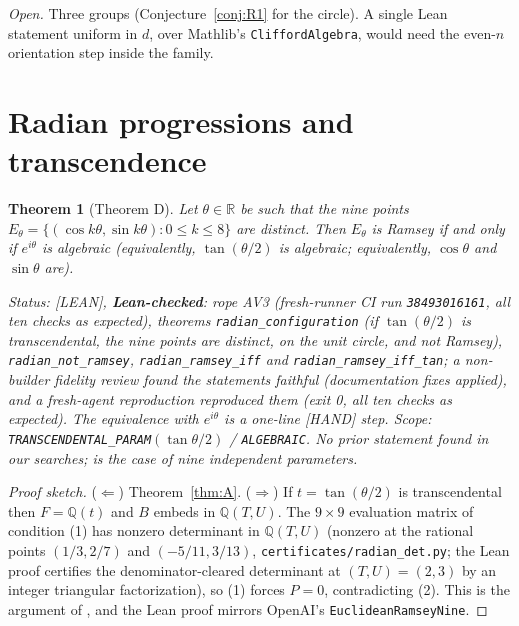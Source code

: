 \documentclass[11pt]{amsart}
\newcommand{\st}[1]{\textsf{[#1]}}
\newcommand{\Q}{\mathbb{Q}}
\newcommand{\R}{\mathbb{R}}
\theoremstyle{plain}
\newtheorem{theorem}{Theorem}[section]
\theoremstyle{definition}
\begin{document}
\noindent\emph{Open.} Three groups (Conjecture~\ref{conj:R1} for the circle). A single Lean statement
uniform in $d$, over Mathlib's \texttt{CliffordAlgebra}, would need the even-$n$ orientation step
inside the family.

\section{Radian progressions and transcendence}\label{sec:radian}

\begin{theorem}[Theorem D]\label{thm:D}
Let $\theta\in\R$ be such that the nine points $E_\theta=\{(\cos k\theta,\sin k\theta):0\le k\le8\}$
are distinct. Then $E_\theta$ is Ramsey if and only if $e^{i\theta}$ is algebraic (equivalently,
$\tan(\theta/2)$ is algebraic; equivalently, $\cos\theta$ and $\sin\theta$ are).

\smallskip\noindent\emph{Status:} \st{LEAN}, \textbf{Lean-checked}: rope AV3 (fresh-runner CI run
\texttt{38493016161}, all ten checks as expected), theorems \texttt{radian\_\allowbreak{}configuration} (if
$\tan(\theta/2)$ is transcendental, the nine points are distinct, on the unit circle, and not Ramsey),
\texttt{radian\_\allowbreak{}not\_\allowbreak{}ramsey}, \texttt{radian\_\allowbreak{}ramsey\_\allowbreak{}iff} and \texttt{radian\_\allowbreak{}ramsey\_\allowbreak{}iff\_\allowbreak{}tan};
a non-builder fidelity review found the statements faithful (documentation fixes applied), and a
fresh-agent reproduction reproduced them (exit 0, all ten checks as expected). The equivalence with $e^{i\theta}$ is a one-line
\st{HAND} step. Scope: \texttt{TRANSCENDENTAL\_\allowbreak{}PARAM}$(\tan\theta/2)$ / \texttt{ALGEBRAIC}. No prior
statement found in our searches; \cite[Prop.~7.6]{OAI172} is the case of nine independent
parameters.
\end{theorem}

\begin{proof}[Proof sketch]
($\Leftarrow$) Theorem~\ref{thm:A}. ($\Rightarrow$) If $t=\tan(\theta/2)$ is transcendental then
$F=\Q(t)$ and $B$ embeds in $\Q(T,U)$. The $9\times9$ evaluation matrix of condition (1) has nonzero
determinant in $\Q(T,U)$ (nonzero at the rational points $(1/3,2/7)$ and $(-5/11,3/13)$, \texttt{certificates/radian\_det.py}; the Lean proof certifies the denominator-cleared determinant at $(T,U)=(2,3)$ by an integer triangular factorization), so (1)
forces $P=0$, contradicting (2). This is the argument of \cite[Prop.~7.6]{OAI172}, and the Lean proof
mirrors OpenAI's \texttt{EuclideanRamseyNine}.
\end{proof}
\end{document}

